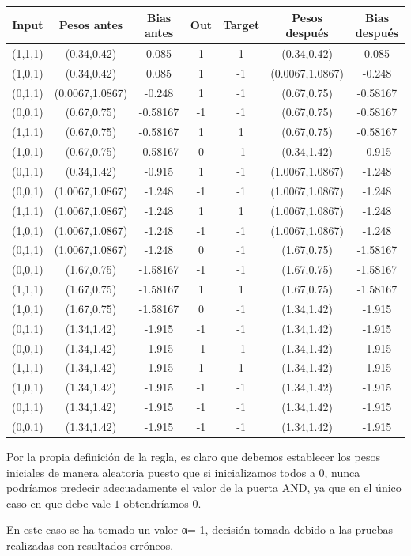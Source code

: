 \begin{problem}[14]
\begin{center}
\begin{tabular}{|c|c|c|c|c|c|c|}
\hline
\textbf{Input} & \textbf{Pesos antes} &  \textbf{Bias antes} & \textbf{Out} & \textbf{Target} & \textbf{Pesos después} & \textbf{Bias después} \\
\hline
(1,1,1) & (0.34,0.42) & 0.085 & 1 & 1 & (0.34,0.42) & 0.085\\
(1,0,1) & (0.34,0.42) & 0.085 & 1 & -1 & (0.0067,1.0867) & -0.248\\
(0,1,1) & (0.0067,1.0867) & -0.248 & 1 & -1 & (0.67,0.75) & -0.58167\\
(0,0,1) & (0.67,0.75) & -0.58167 & -1 & -1 & (0.67,0.75) & -0.58167\\
(1,1,1) & (0.67,0.75) & -0.58167 & 1 & 1 & (0.67,0.75) & -0.58167\\
(1,0,1) & (0.67,0.75) & -0.58167 & 0 & -1 & (0.34,1.42) & -0.915\\
(0,1,1) & (0.34,1.42) & -0.915 & 1 & -1 & (1.0067,1.0867) & -1.248\\
(0,0,1) & (1.0067,1.0867) & -1.248 & -1 & -1 & (1.0067,1.0867) & -1.248\\
(1,1,1) & (1.0067,1.0867) & -1.248 & 1 & 1 & (1.0067,1.0867) & -1.248\\
(1,0,1) & (1.0067,1.0867) & -1.248 & -1 & -1 & (1.0067,1.0867) & -1.248\\
(0,1,1) & (1.0067,1.0867) & -1.248 & 0 & -1 & (1.67,0.75) & -1.58167\\
(0,0,1) & (1.67,0.75) & -1.58167 & -1 & -1 & (1.67,0.75) & -1.58167\\
(1,1,1) & (1.67,0.75) & -1.58167 & 1 & 1 & (1.67,0.75) & -1.58167\\
(1,0,1) & (1.67,0.75) & -1.58167 & 0 & -1 & (1.34,1.42) & -1.915\\
(0,1,1) & (1.34,1.42) & -1.915 & -1 & -1 & (1.34,1.42) & -1.915\\
(0,0,1) & (1.34,1.42) & -1.915 & -1 & -1 & (1.34,1.42) & -1.915\\
(1,1,1) & (1.34,1.42) & -1.915 & 1 & 1 & (1.34,1.42) & -1.915\\
(1,0,1) & (1.34,1.42) & -1.915 & -1 & -1 & (1.34,1.42) & -1.915\\
(0,1,1) & (1.34,1.42) & -1.915 & -1 & -1 & (1.34,1.42) & -1.915\\
(0,0,1) & (1.34,1.42) & -1.915 & -1 & -1 & (1.34,1.42) & -1.915\\

\hline
\end{tabular}
\end{center}

Por la propia definición de la regla, es claro que debemos establecer los pesos iniciales de manera aleatoria puesto que si inicializamos todos a $0$, nunca podríamos predecir adecuadamente el valor de la puerta AND, ya que en el único caso en que debe vale $1$ obtendríamos 0.

En este caso se ha tomado un valor α=-1, decisión tomada debido a las pruebas realizadas con resultados erróneos.
\end{problem}

